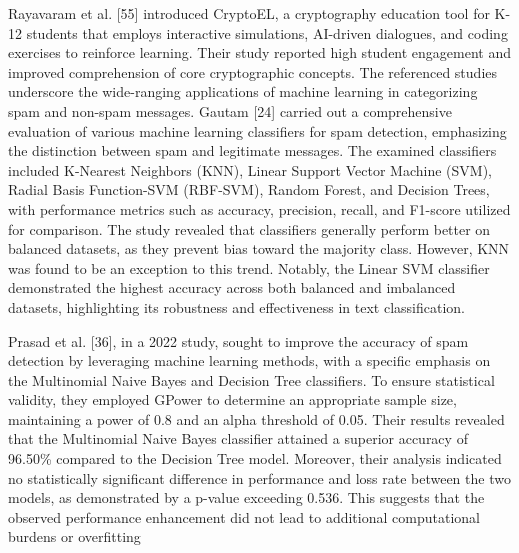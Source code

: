 Rayavaram et al. [55] introduced CryptoEL, a cryptography education tool for K-12 students that employs interactive simulations, AI-driven dialogues, and coding exercises to reinforce learning. Their study reported high student engagement and improved comprehension of core cryptographic concepts. The referenced studies underscore the wide-ranging applications of machine learning in categorizing spam and non-spam messages. Gautam [24] carried out a comprehensive evaluation of various machine learning classifiers for spam detection, emphasizing the distinction between spam and legitimate messages. The examined classifiers included K-Nearest Neighbors (KNN), Linear Support Vector Machine (SVM), Radial Basis Function-SVM (RBF-SVM), Random Forest, and Decision Trees, with performance metrics such as accuracy, precision, recall, and F1-score utilized for comparison. The study revealed that classifiers generally perform better on balanced datasets, as they prevent bias toward the majority class. However, KNN was found to be an exception to this trend. Notably, the Linear SVM classifier demonstrated the highest accuracy across both balanced and imbalanced datasets, highlighting its robustness and effectiveness in text classification.

Prasad et al. [36], in a 2022 study, sought to improve the accuracy of spam detection by leveraging machine learning methods, with a specific emphasis on the Multinomial Naive Bayes and Decision Tree classifiers. To ensure statistical validity, they employed GPower to determine an appropriate sample size, maintaining a power of 0.8 and an alpha threshold of 0.05. Their results revealed that the Multinomial Naive Bayes classifier attained a superior accuracy of 96.50\% compared to the Decision Tree model. Moreover, their analysis indicated no statistically significant difference in performance and loss rate between the two models, as demonstrated by a p-value exceeding 0.536. This suggests that the observed performance enhancement did not lead to additional computational burdens or overfitting